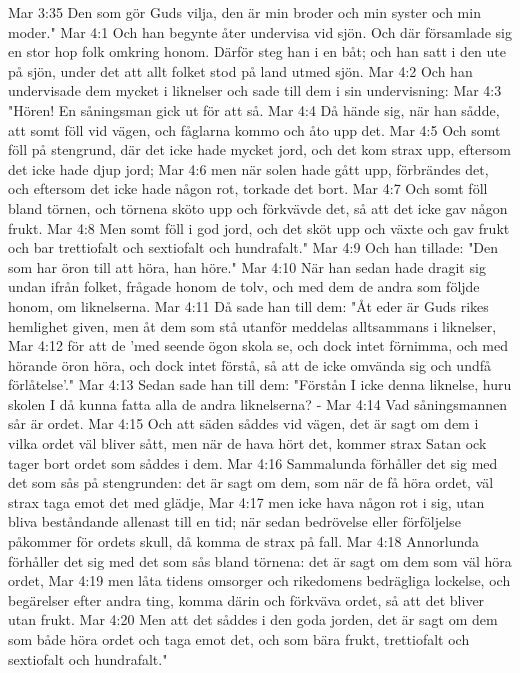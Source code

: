 Mar 3:35  Den som gör Guds vilja, den är min broder och min syster och min moder."
Mar 4:1  Och han begynte åter undervisa vid sjön. Och där församlade sig en stor hop folk omkring honom. Därför steg han i en båt; och han satt i den ute på sjön, under det att allt folket stod på land utmed sjön.
Mar 4:2  Och han undervisade dem mycket i liknelser och sade till dem i sin undervisning:
Mar 4:3  "Hören! En såningsman gick ut för att så.
Mar 4:4  Då hände sig, när han sådde, att somt föll vid vägen, och fåglarna kommo och åto upp det.
Mar 4:5  Och somt föll på stengrund, där det icke hade mycket jord, och det kom strax upp, eftersom det icke hade djup jord;
Mar 4:6  men när solen hade gått upp, förbrändes det, och eftersom det icke hade någon rot, torkade det bort.
Mar 4:7  Och somt föll bland törnen, och törnena sköto upp och förkvävde det, så att det icke gav någon frukt.
Mar 4:8  Men somt föll i god jord, och det sköt upp och växte och gav frukt och bar trettiofalt och sextiofalt och hundrafalt."
Mar 4:9  Och han tillade: "Den som har öron till att höra, han höre."
Mar 4:10  När han sedan hade dragit sig undan ifrån folket, frågade honom de tolv, och med dem de andra som följde honom, om liknelserna.
Mar 4:11  Då sade han till dem: "Åt eder är Guds rikes hemlighet given, men åt dem som stå utanför meddelas alltsammans i liknelser,
Mar 4:12  för att de 'med seende ögon skola se, och dock intet förnimma, och med hörande öron höra, och dock intet förstå, så att de icke omvända sig och undfå förlåtelse'."
Mar 4:13  Sedan sade han till dem: "Förstån I icke denna liknelse, huru skolen I då kunna fatta alla de andra liknelserna? -
Mar 4:14  Vad såningsmannen sår är ordet.
Mar 4:15  Och att säden såddes vid vägen, det är sagt om dem i vilka ordet väl bliver sått, men när de hava hört det, kommer strax Satan ock tager bort ordet som såddes i dem.
Mar 4:16  Sammalunda förhåller det sig med det som sås på stengrunden: det är sagt om dem, som när de få höra ordet, väl strax taga emot det med glädje,
Mar 4:17  men icke hava någon rot i sig, utan bliva beståndande allenast till en tid; när sedan bedrövelse eller förföljelse påkommer för ordets skull, då komma de strax på fall.
Mar 4:18  Annorlunda förhåller det sig med det som sås bland törnena: det är sagt om dem som väl höra ordet,
Mar 4:19  men låta tidens omsorger och rikedomens bedrägliga lockelse, och begärelser efter andra ting, komma därin och förkväva ordet, så att det bliver utan frukt.
Mar 4:20  Men att det såddes i den goda jorden, det är sagt om dem som både höra ordet och taga emot det, och som bära frukt, trettiofalt och sextiofalt och hundrafalt."
